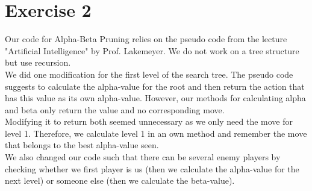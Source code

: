 \section{Exercise 2}
Our code for Alpha-Beta Pruning relies on the pseudo code from the lecture "Artificial Intelligence" by Prof. Lakemeyer. We do not work on a tree structure but use recursion.\\
We did one modification for the first level of the search tree. The pseudo code suggests to calculate the alpha-value for the root and then return the action that has this value as its own alpha-value. However, our methods for calculating alpha and beta only return the value and no corresponding move.\\
Modifying it to return both seemed unnecessary as we only need the move for level 1. Therefore, we calculate level 1 in an own method and remember the move that belongs to the best alpha-value seen.\\
We also changed our code such that there can be several enemy players by checking whether we first player is us (then we calculate the alpha-value for the next level) or someone else (then we calculate the beta-value).